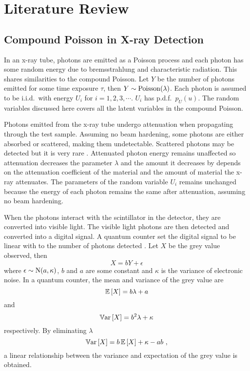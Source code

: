 \section{Literature Review}

\subsection{Compound Poisson in X-ray Detection}

In an x-ray tube, photons are emitted as a Poisson process and each photon has some random energy due to bremsstrahlung and characteristic radiation. This shares similarities to the compound Poisson. Let $Y$ be the number of photons emitted for some time exposure $\tau$, then $Y\sim\operatorname{Poisson}(\lambda)$. Each photon is assumed to be i.i.d.~with energy $U_i$ for $i=1,2,3,\cdots$. $U_i$ has p.d.f.~$p_U(u)$. The random variables discussed here covers all the latent variables in the compound Poisson.

Photons emitted from the x-ray tube undergo attenuation when propagating through the test sample. Assuming no beam hardening, some photons are either absorbed or scattered, making them undetectable. Scattered photons may be detected but it is very rare \citep{cantatore2011introduction}. Attenuated photon energy remains unaffected so attenuation decreases the parameter $\lambda$ and the amount it decreases by depends on the attenuation coefficient of the material and the amount of material the x-ray attenuates. The parameters of the random variable $U_i$ remains unchanged because the energy of each photon remains the same after attenuation, assuming no beam hardening.

When the photons interact with the scintillator in the detector, they are converted into visible light. The visible light photons are then detected and converted into a digital signal. A quantum counter set the digital signal to be linear with to the number of photons detected \citep{whiting2006properties}. Let $X$ be the grey value observed, then
\begin{equation}
X = bY + \epsilon
\end{equation}
where $\epsilon\sim\operatorname{N}(a,\kappa)$, $b$ and $a$ are some constant and $\kappa$ is the variance of electronic noise. In a quantum counter, the mean and variance of the grey value are
\begin{equation}
\operatorname{\mathbb{E}}\left[X\right] = b\lambda + a
\end{equation}
and
\begin{equation}
\operatorname{\mathbb{V}ar}\left[X\right] = b^2\lambda + \kappa
\end{equation}
respectively. By eliminating $\lambda$
\begin{equation}
\operatorname{\mathbb{V}ar}\left[X\right] = b\operatorname{\mathbb{E}}\left[X\right]+\kappa-ab \ ,
\end{equation}
a linear relationship between the variance and expectation of the grey value \citep{ma2012varaince} is obtained.

